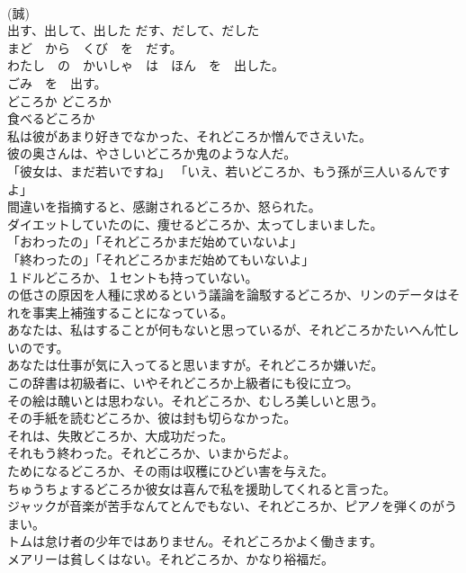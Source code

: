 \documentclass[8pt]{extreport}
\begin{document}
\begin{CJK}{UTF8}{min}
\\	(誠)
\\	出す、出して、出した	だす、だして、だした	
\\	まど　から　くび　を　だす。  
\\	わたし　の　かいしゃ　は　ほん　を　出した。  
\\	ごみ　を　出す。  
\\	どころか	どころか	
\\	食べるどころか  
\\	私は彼があまり好きでなかった、それどころか憎んでさえいた。  
\\	彼の奥さんは、やさしいどころか鬼のような人だ。  
\\	「彼女は、まだ若いですね」 「いえ、若いどころか、もう孫が三人いるんですよ」  
\\	間違いを指摘すると、感謝されるどころか、怒られた。  
\\	ダイエットしていたのに、痩せるどころか、太ってしまいました。  
\\	「おわったの」「それどころかまだ始めていないよ」   
\\	「終わったの」「それどころかまだ始めてもいないよ」   
\\	１ドルどころか、１セントも持っていない。   
\\	の低さの原因を人種に求めるという議論を論駁するどころか、リンのデータはそれを事実上補強することになっている。   
\\	あなたは、私はすることが何もないと思っているが、それどころかたいへん忙しいのです。   
\\	あなたは仕事が気に入ってると思いますが。それどころか嫌いだ。   
\\	この辞書は初級者に、いやそれどころか上級者にも役に立つ。   
\\	その絵は醜いとは思わない。それどころか、むしろ美しいと思う。   
\\	その手紙を読むどころか、彼は封も切らなかった。   
\\	それは、失敗どころか、大成功だった。   
\\	それもう終わった。それどころか、いまからだよ。   
\\	ためになるどころか、その雨は収穫にひどい害を与えた。   
\\	ちゅうちょするどころか彼女は喜んで私を援助してくれると言った。   
\\	ジャックが音楽が苦手なんてとんでもない、それどころか、ピアノを弾くのがうまい。   
\\	トムは怠け者の少年ではありません。それどころかよく働きます。   
\\	メアリーは貧しくはない。それどころか、かなり裕福だ。   

\end{CJK}
\end{document}
